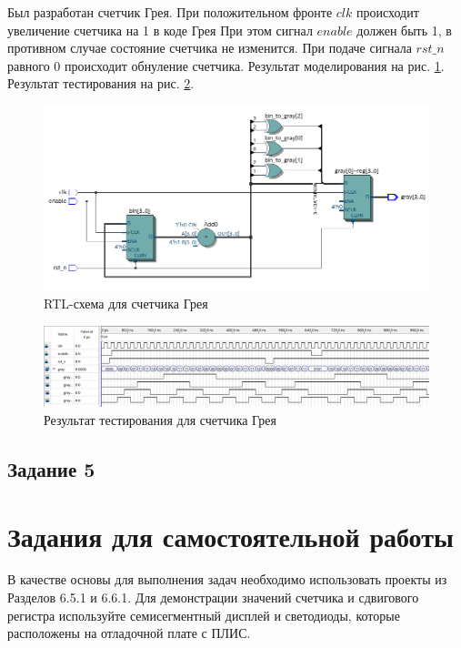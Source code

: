 \documentclass[a4paper,14pt]{article}
\begin{document}
	Был разработан счетчик Грея.
	При положительном фронте $clk$ происходит увеличение счетчика на 1 в коде Грея При этом сигнал $enable$ должен быть 1, в противном случае состояние счетчика не изменится. При подаче сигнала $rst\_n$ равного 0 происходит обнуление счетчика.
	Результат моделирования на рис. \ref{fig:z5_rtl}. Результат тестирования на рис. \ref{fig:z5_test}.
	
	\begin{figure}[H]
		\centering
		\includegraphics[width=\linewidth]{images/z5_rtl}
		\caption{RTL-схема для счетчика Грея}
		\label{fig:z5_rtl}
	\end{figure}
	
	\begin{figure}[H]
		\centering
		\includegraphics[width=\linewidth]{images/z5_test}
		\caption{Результат тестирования для счетчика Грея}
		\label{fig:z5_test}
	\end{figure}

	\subsection{Задание 5}
	
	\section{Задания для самостоятельной работы}
	
	В качестве основы для выполнения задач необходимо использовать проекты из
	Разделов 6.5.1 и 6.6.1. Для демонстрации значений счетчика и сдвигового регистра
	используйте семисегментный дисплей и светодиоды, которые расположены на отладочной
	плате с ПЛИС.
	
\end{document}
